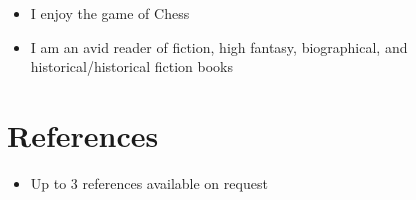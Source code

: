 \documentclass[11pt,a4paper,sans]{moderncv}        %
\begin{document}
\begin{itemize}

\item{I enjoy the game of Chess}

\vspace{6pt}

\item{I am an avid reader of fiction, high fantasy, biographical, and historical/historical fiction books}

\end{itemize}

\section{References}

\vspace{6pt}
 
\begin{itemize}

\item{Up to 3 references available on request}

\end{itemize}

\nocite{*}



\end{document}
